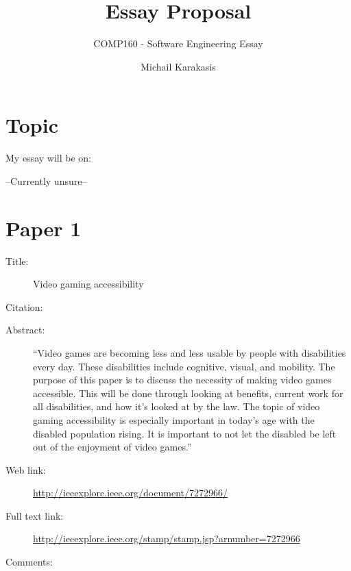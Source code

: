 \documentclass{scrartcl}
\title{Essay Proposal}
\subtitle{COMP160 - Software Engineering Essay}
\author{Michail Karakasis}
\begin{document}
\maketitle

\section*{Topic}

My essay will be on:

--Currently unsure--

\section*{Paper 1}
\begin{description}
\item[Title:] Video gaming accessibility
\item[Citation:] \cite{McPheron}
\item[Abstract:] ``Video games are becoming less and less usable by people with disabilities every day. These disabilities include cognitive, visual, and mobility. The purpose of this paper is to discuss the necessity of making video games accessible. This will be done through looking at benefits, current work for all disabilities, and how it's looked at by the law. The topic of video gaming accessibility is especially important in today's age with the disabled population rising. It is important to not let the disabled be left out of the enjoyment of video games.''
\item[Web link:] \url {http://ieeexplore.ieee.org/document/7272966/}
\item[Full text link:] \url {http://ieeexplore.ieee.org/stamp/stamp.jsp?arnumber=7272966}
\item[Comments:] 
\end{description}
\end{document}
